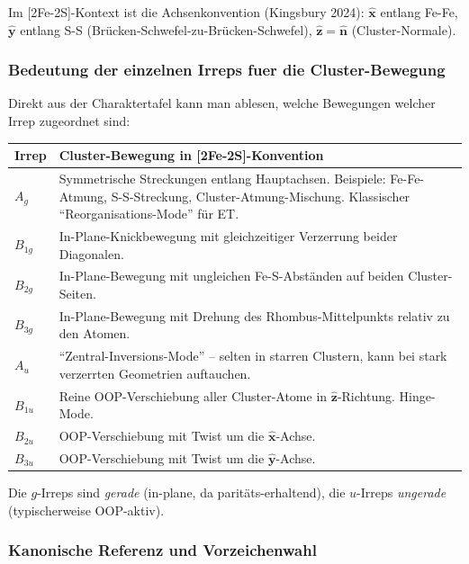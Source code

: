 \documentclass[11pt,a4paper,twoside]{article}
\theoremstyle{remark}
\begin{document}
Im [2Fe-2S]-Kontext ist die Achsenkonvention (Kingsbury 2024):
$\hat{\mathbf{x}}$ entlang Fe-Fe, $\hat{\mathbf{y}}$ entlang S-S
(Br\"ucken-Schwefel-zu-Br\"ucken-Schwefel),
$\hat{\mathbf{z}} = \hat{\mathbf{n}}$ (Cluster-Normale).

\subsubsection*{Bedeutung der einzelnen Irreps fuer die Cluster-Bewegung}

Direkt aus der Charaktertafel kann man ablesen, welche Bewegungen
welcher Irrep zugeordnet sind:

\begin{center}
\begin{tabular}{lp{8.5cm}}
  \toprule
  \textbf{Irrep} & \textbf{Cluster-Bewegung in [2Fe-2S]-Konvention} \\
  \midrule
  $A_g$    & Symmetrische Streckungen entlang Hauptachsen.
             Beispiele: Fe-Fe-Atmung, S-S-Streckung,
             Cluster-Atmung-Mischung. Klassischer
             "`Reorganisations-Mode"' f\"ur ET. \\
  $B_{1g}$ & In-Plane-Knickbewegung mit gleichzeitiger Verzerrung
             beider Diagonalen. \\
  $B_{2g}$ & In-Plane-Bewegung mit ungleichen Fe-S-Abst\"anden auf
             beiden Cluster-Seiten. \\
  $B_{3g}$ & In-Plane-Bewegung mit Drehung des Rhombus-Mittelpunkts
             relativ zu den Atomen. \\
  $A_u$    & "`Zentral-Inversions-Mode"' -- selten in starren
             Clustern, kann bei stark verzerrten Geometrien
             auftauchen. \\
  $B_{1u}$ & Reine OOP-Verschiebung aller Cluster-Atome in
             $\hat{\mathbf{z}}$-Richtung. Hinge-Mode. \\
  $B_{2u}$ & OOP-Verschiebung mit Twist um die $\hat{\mathbf{x}}$-Achse. \\
  $B_{3u}$ & OOP-Verschiebung mit Twist um die $\hat{\mathbf{y}}$-Achse. \\
  \bottomrule
\end{tabular}
\end{center}

Die $g$-Irreps sind \emph{gerade} (in-plane, da paritäts-erhaltend),
die $u$-Irreps \emph{ungerade} (typischerweise OOP-aktiv).

\subsubsection*{Kanonische Referenz und Vorzeichenwahl}
\end{document}
